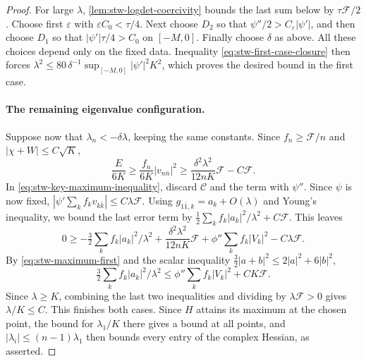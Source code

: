 \begin{proof}
For large $\lambda$, \cref{lem:stw-logdet-coercivity} bounds the last sum below by $\tau\mathcal F/2$. Choose first $\varepsilon$ with $\varepsilon C_0<\tau/4$. Next choose $D_2$ so that $\psi''/2>C_\varepsilon|\psi'|$, and then choose $D_1$ so that $|\psi'|\tau/4>C_0$ on $[-M,0]$. Finally choose $\delta$ as above. All these choices depend only on the fixed data. Inequality \eqref{eq:stw-first-case-closure} then forces $\lambda^2\leq80\,\delta^{-1}\sup_{[-M,0]}|\psi'|^2K^2$, which proves the desired bound in the first case.

\paragraph{The remaining eigenvalue configuration.}
Suppose now that $\lambda_n<-\delta\lambda$, keeping the same constants. Since $f_n\geq\mathcal F/n$ and $|\chi+W|\leq C\sqrt K$,
\[
 \frac{E}{6K}\geq\frac{f_n}{6K}|v_{n\bar n}|^2
       \geq\frac{\delta^2\lambda^2}{12nK}\mathcal F-C\mathcal F.
\]
In \eqref{eq:stw-key-maximum-inequality}, discard $\mathcal C$ and the term with $\psi''$. Since $\psi$ is now fixed, $|\psi'\sum_k f_kv_{k\bar k}|\leq C\lambda\mathcal F$. Using $g_{1\bar1,k}=a_k+O(\lambda)$ and Young's inequality, we bound the last error term by
$\frac12\sum_k f_k|a_k|^2/\lambda^2+C\mathcal F$. This leaves
\[
 0\geq-\tfrac32\sum_k f_k|a_k|^2/\lambda^2
       +\frac{\delta^2\lambda^2}{12nK}\mathcal F
       +\phi''\sum_k f_k|V_k|^2-C\lambda\mathcal F.
\]
By \eqref{eq:stw-maximum-first} and the scalar inequality
$\tfrac32|a+b|^2\leq2|a|^2+6|b|^2$,
\[
 \tfrac32\sum_k f_k|a_k|^2/\lambda^2
       \leq\phi''\sum_k f_k|V_k|^2+CK\mathcal F.
\]
Since $\lambda\geq K$, combining the last two inequalities and dividing by $\lambda\mathcal F>0$ gives $\lambda/K\leq C$. This finishes both cases. Since $H$ attains its maximum at the chosen point, the bound for $\lambda_1/K$ there gives a bound at all points, and $|\lambda_i|\leq(n-1)\lambda_1$ then bounds every entry of the complex Hessian, as asserted.
\end{proof}
